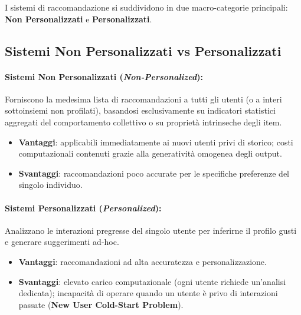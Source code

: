 I sistemi di raccomandazione si suddividono in due macro-categorie principali: \textbf{Non Personalizzati} e \textbf{Personalizzati}.

\subsection{Sistemi Non Personalizzati vs Personalizzati}

\paragraph{Sistemi Non Personalizzati (\textit{Non-Personalized}):}
Forniscono la medesima lista di raccomandazioni a tutti gli utenti (o a interi sottoinsiemi non profilati), basandosi esclusivamente su indicatori statistici aggregati del comportamento collettivo o su proprietà intrinseche degli item.
\begin{itemize}
    \item \textbf{Vantaggi}: applicabili immediatamente ai nuovi utenti privi di storico; costi computazionali contenuti grazie alla generatività omogenea degli output.
    \item \textbf{Svantaggi}: raccomandazioni poco accurate per le specifiche preferenze del singolo individuo.
\end{itemize}

\paragraph{Sistemi Personalizzati (\textit{Personalized}):}
Analizzano le interazioni pregresse del singolo utente per inferirne il profilo gusti e generare suggerimenti ad-hoc.
\begin{itemize}
    \item \textbf{Vantaggi}: raccomandazioni ad alta accuratezza e personalizzazione.
    \item \textbf{Svantaggi}: elevato carico computazionale (ogni utente richiede un'analisi dedicata); incapacità di operare quando un utente è privo di interazioni passate (\textbf{New User Cold-Start Problem}).
\end{itemize}

